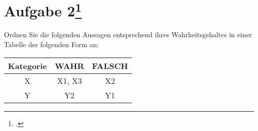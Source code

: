 \documentclass{lehramt-informatik-aufgabe}
\begin{document}

\section{Aufgabe 2\footcite{sosy:ab:9}}

Ordnen Sie die folgenden Aussagen entsprechend ihres Wahrheitsgehaltes
in einer Tabelle der folgenden Form an:

\begin{center}
\begin{tabular}{|c|c|c|}
\hline
Kategorie & WAHR & FALSCH \\\hline\hline
X & X1, X3 & X2 \\\hline
Y & Y2 & Y1 \\\hline
\end{tabular}
\end{center}
\end{document}
